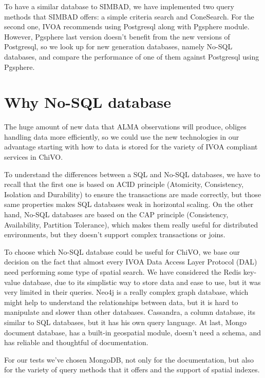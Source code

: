 \documentclass[11pt,twoside]{article}
\begin{document}
To have a similar database to SIMBAD, we have implemented two query methods that
SIMBAD offers: a simple criteria search and ConeSearch. For the second one, 
IVOA recommends using Postgresql along with Pgsphere module. 
However, Pgsphere last version doesn't
benefit from the new versions of Postgresql, 
so we look up for new generation databases, namely No-SQL databases, and compare the
performance of one of them against Postgresql using Pgsphere.


\section{Why No-SQL database}
    The huge amount of new data that ALMA observations will produce, obliges
    handling data more efficiently, so we could use the new technologies 
    in our advantage starting with how to data is stored for the variety
    of IVOA compliant services in ChiVO.
    
    To understand the differences between a SQL and No-SQL databases, we have
    to recall that the first one is based on ACID principle 
    (Atomicity, Consistency, Isolation and Durability) to ensure the
    transactions are made correctly, but those same properties
    makes SQL databases weak in horizontal scaling. On the other hand, No-SQL
    databases are based on the CAP principle (Consistency, Availability, Partition
    Tolerance), which makes them really useful for distributed environments, but 
    they doesn't support complex transactions or joins.

    To choose which No-SQL database could be useful for ChiVO, we base our
    decision on the fact that almost every
    IVOA Data Access Layer Protocol (DAL) need performing some type of spatial
    search. We have considered the Redis key-value database, due to its
    simplistic way to store data and ease to use, but it was very limited in
    their queries. Neo4j is a really complex graph database, which might help to
    understand the relationships between data, but it is hard to manipulate and slower 
    than other databases. Cassandra, a column database, its similar
    to SQL databases, but it has his own query language. At last, Mongo document database, 
    has a built-in geospatial module, doesn't need a schema, and has reliable
    and thoughtful of documentation.

    For our tests we've chosen MongoDB, not only for the documentation, but also
    for the variety of query methods that it offers and the support of spatial indexes.
\end{document}
